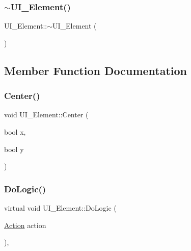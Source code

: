 \subsubsection{\texorpdfstring{$\sim$UI\_Element()}{~UI\_Element()}}
{\footnotesize\ttfamily U\+I\+\_\+\+Element\+::$\sim$\+U\+I\+\_\+\+Element (\begin{DoxyParamCaption}{ }\end{DoxyParamCaption})\hspace{0.3cm}{\ttfamily [inline]}}



\subsection{Member Function Documentation}
\mbox{\label{class_u_i___element_af6d7b22a1dcb4e2d07e6b28585f5ae48}} 
\subsubsection{\texorpdfstring{Center()}{Center()}}
{\footnotesize\ttfamily void U\+I\+\_\+\+Element\+::\+Center (\begin{DoxyParamCaption}\item[{bool}]{x,  }\item[{bool}]{y }\end{DoxyParamCaption})\hspace{0.3cm}{\ttfamily [inline]}}

\mbox{\label{class_u_i___element_aef56a211bea0e79047fb2d382789ff90}} 
\subsubsection{\texorpdfstring{DoLogic()}{DoLogic()}}
{\footnotesize\ttfamily virtual void U\+I\+\_\+\+Element\+::\+Do\+Logic (\begin{DoxyParamCaption}\item[{\mbox{\hyperlink{class_u_i___element_ae179047d98a379f4e0dcdf0871c7b8d6}{Action}}}]{action }\end{DoxyParamCaption})\hspace{0.3cm}{\ttfamily [inline]}, {\ttfamily [virtual]}}

